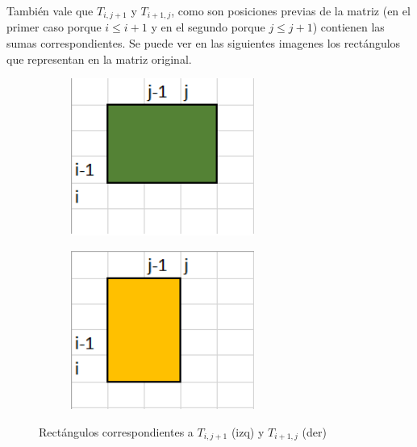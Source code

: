 También vale que $T_{i,j+1}$ y $T_{i+1,j}$, como son posiciones previas de la matriz (en el primer caso porque $i \leq i+1$ y en el segundo porque $j \leq j+1$) contienen las sumas correspondientes. Se puede ver en las siguientes imagenes los rectángulos que representan en la matriz original.

\begin{figure}[H]
 
\begin{subfigure}{0.5\textwidth}
    \centering
\includegraphics[width=6cm]{Imagenes/Ej3g.png} 
\end{subfigure}
\begin{subfigure}{0.5\textwidth}
    \centering
\includegraphics[width=6cm]{Imagenes/Ej3h.png}
\end{subfigure}
 
\caption{Rectángulos correspondientes a $T_{i,j+1}$ (izq) y $T_{i+1,j}$ (der)}
\end{figure}




